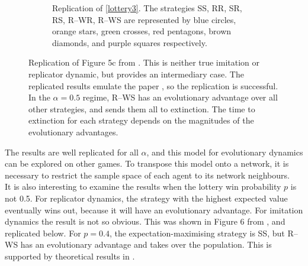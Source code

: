 \begin{figure}[!h]
\begin{subfigure}[b]{0.45\textwidth}
    \caption{Replication of \ref{lottery3}. The strategies SS, RR, SR, RS, R--WR, R--WS are represented by blue circles, orange stars, green crosses, red pentagons, brown diamonds, and purple squares respectively. }
    \label{lottery3_me}
  \end{subfigure}
  \caption{Replication of Figure 5c from \cite{RN30}. This is neither true imitation or replicator dynamic, but provides an intermediary case. The replicated results emulate the paper \cite{RN30}, so the replication is successful. In the $\alpha = 0.5$ regime, R--WS has an evolutionary advantage over all other strategies, and sends them all to extinction. The time to extinction for each strategy depends on the magnitudes of the evolutionary advantages. } \label{lottery_comp2}
\end{figure} 
\FloatBarrier
The results are well replicated for all $\alpha$, and this model for evolutionary dynamics can be explored on other games. To transpose this model onto a network, it is necessary to restrict the sample space of each agent to its network neighbours. \\

 It is also interesting to examine the results when the lottery win probability $p$ is not 0.5. For replicator dynamics, the strategy with the highest expected value eventually wins out, because it will have an evolutionary advantage. For imitation dynamics the result is not so obvious. This was shown in Figure 6 from \cite{RN30}, and replicated below. For $p=0.4$, the expectation-maximising strategy is SS, but R--WS has an evolutionary advantage and takes over the population. This is supported by theoretical results in \cite{RN30}.  \\
 
